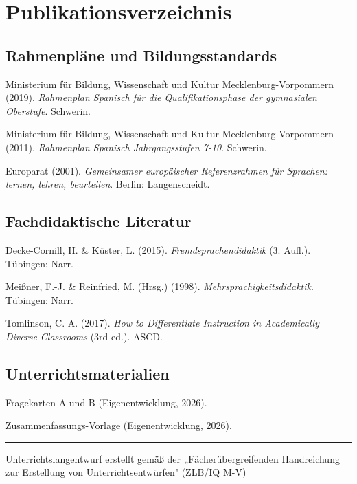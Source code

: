 \documentclass[11pt, a4paper]{article}
\begin{document}

\newpage
\section{Publikationsverzeichnis}

\subsection*{Rahmenpläne und Bildungsstandards}

Ministerium für Bildung, Wissenschaft und Kultur Mecklenburg-Vorpommern (2019). \textit{Rahmenplan Spanisch für die Qualifikationsphase der gymnasialen Oberstufe}. Schwerin.

Ministerium für Bildung, Wissenschaft und Kultur Mecklenburg-Vorpommern (2011). \textit{Rahmenplan Spanisch Jahrgangsstufen 7-10}. Schwerin.

Europarat (2001). \textit{Gemeinsamer europäischer Referenzrahmen für Sprachen: lernen, lehren, beurteilen}. Berlin: Langenscheidt.

\subsection*{Fachdidaktische Literatur}

Decke-Cornill, H. \& Küster, L. (2015). \textit{Fremdsprachendidaktik} (3. Aufl.). Tübingen: Narr.

Meißner, F.-J. \& Reinfried, M. (Hrsg.) (1998). \textit{Mehrsprachigkeitsdidaktik}. Tübingen: Narr.

Tomlinson, C. A. (2017). \textit{How to Differentiate Instruction in Academically Diverse Classrooms} (3rd ed.). ASCD.

\subsection*{Unterrichtsmaterialien}

Fragekarten A und B (Eigenentwicklung, 2026).

Zusammenfassungs-Vorlage (Eigenentwicklung, 2026).

\vfill

\hrule
\vspace{0.3cm}
\begin{center}
    {\small\color{grau} Unterrichtslangentwurf erstellt gemäß der „Fächerübergreifenden Handreichung zur Erstellung von Unterrichtsentwürfen" (ZLB/IQ M-V)}
\end{center}
\end{document}
